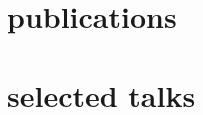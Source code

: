 \documentclass[]{luger-cv} %
\begin{document}
    \section{publications}
    \begin{list}{}{\pubslist}
        
    \end{list}
    \vspace{1em}
\fi


\ifdefined \withtalks
    \section{selected talks}
    \begin{list}{}{\pubslist}
        
    \end{list}
\fi
\end{document}
